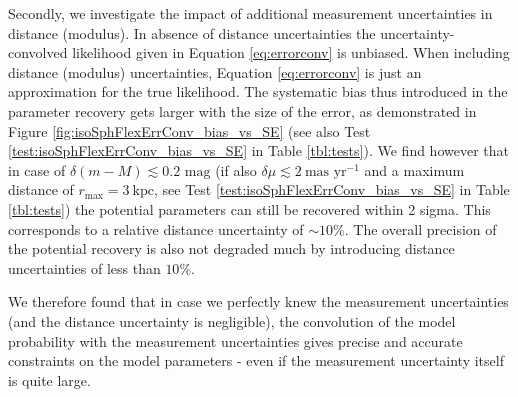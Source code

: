 Secondly, we investigate the impact of additional measurement uncertainties in distance (modulus). In absence of distance uncertainties the uncertainty-convolved likelihood given in Equation \ref{eq:errorconv} is unbiased.  When including distance (modulus) uncertainties, Equation \ref{eq:errorconv} is just an approximation for the true likelihood. The systematic bias thus introduced in the parameter recovery gets larger with the size of the error, as demonstrated in Figure \ref{fig:isoSphFlexErrConv_bias_vs_SE} (see also Test \ref{test:isoSphFlexErrConv_bias_vs_SE} in Table \ref{tbl:tests}).  We find however that in case of $\delta(m-M) \lesssim 0.2 \text{ mag}$ (if also $\delta \mu \lesssim 2 ~\text{mas yr}^{-1}$ and a maximum distance of $r_\text{max} = 3~\text{kpc}$, see Test \ref{test:isoSphFlexErrConv_bias_vs_SE} in Table \ref{tbl:tests}) the potential parameters can still be recovered within 2 sigma. This corresponds to a relative distance uncertainty of $\sim10\%$. The overall precision of the potential recovery is also not degraded much by introducing distance uncertainties of less than $10\%$.

We therefore found that in case we perfectly knew the measurement uncertainties (and the distance uncertainty is negligible), the convolution of the model probability with the measurement uncertainties gives precise and accurate constraints on the model parameters - even if the measurement uncertainty itself is quite large.






